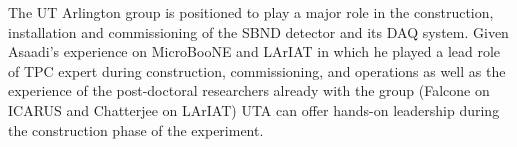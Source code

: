  


%



\label{sec:SBNDBulid}
The UT Arlington group is positioned to play a major role in the construction, installation and commissioning of the SBND detector and its DAQ system. Given Asaadi's experience on MicroBooNE and LArIAT in which he played a lead role of TPC expert during construction, commissioning, and operations as well as the experience of the post-doctoral researchers already with the group (Falcone on ICARUS and Chatterjee on LArIAT) UTA can offer hands-on leadership during the construction phase of the experiment.

